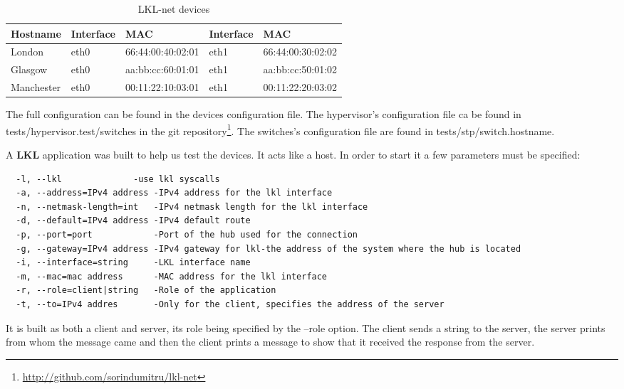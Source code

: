 
\begin{center}
  \begin{table}[htb]
  \begin{center}
  \begin{tabular}{| l | l | l | l | l |}
    \hline
      Hostname & Interface & MAC & Interface & MAC \\ \hline
      London & eth0 & 66:44:00:40:02:01 & eth1 & 66:44:00:30:02:02 \\ \hline
      Glasgow & eth0 & aa:bb:cc:60:01:01 & eth1 & aa:bb:cc:50:01:02 \\ \hline
      Manchester & eth0 & 00:11:22:10:03:01 & eth1 & 00:11:22:20:03:02 \\
    \hline
  \end{tabular}
  \end{center}
  \caption{LKL-net devices}
  \label{table:tdevices}
  \end{table}
\end{center}

The full configuration can be found in the devices configuration file. The hypervisor's configuration file
ca be found in tests/hypervisor.test/switches in the git repository\footnote{\url{http://github.com/sorindumitru/lkl-net}}.
The switches's configuration file are found in tests/stp/switch.hostname.

A \textbf{LKL} application was built to help us test the devices. It acts like a host. In order to start it
a few parameters must be specified:
\begin{lstlisting} 
  -l, --lkl 		     -use lkl syscalls
  -a, --address=IPv4 address -IPv4 address for the lkl interface
  -n, --netmask-length=int   -IPv4 netmask length for the lkl interface
  -d, --default=IPv4 address -IPv4 default route
  -p, --port=port            -Port of the hub used for the connection
  -g, --gateway=IPv4 address -IPv4 gateway for lkl-the address of the system where the hub is located
  -i, --interface=string     -LKL interface name
  -m, --mac=mac address      -MAC address for the lkl interface
  -r, --role=client|string   -Role of the application
  -t, --to=IPv4 addres       -Only for the client, specifies the address of the server
\end{lstlisting}
It is built as both a client and server, its role being specified by the --role option. The client
sends a string to the server, the server prints from whom the message came and then the client prints
a message to show that it received the response from the server.

